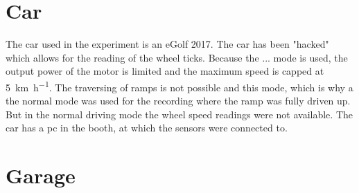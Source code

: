 \section{Car}
The car used in the experiment is an eGolf 2017.
The car has been "hacked" which allows for the reading of the wheel ticks.
Because the ... mode is used, the output power of the motor is limited and the maximum speed is capped at \SI{5}{\kilo\metre\per\hour}.
The traversing of ramps is not possible and this mode, which is why a the normal mode was used for the recording where the ramp was fully driven up.
But in the normal driving mode the wheel speed readings were not available.
The car has a pc in the booth, at which the sensors were connected to.



\section{Garage}
